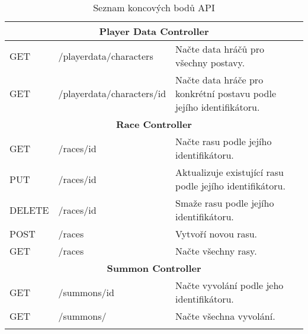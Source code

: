 \begin{longtable}{|l|l|p{}|}
    \hline
    \multicolumn{3}{|c|}{\textbf{Player Data Controller}}                                                                                                                                      \\
    \hline
    GET             & /playerdata/characters      & Načte data hráčů pro všechny postavy.                                                                                                      \\
    GET             & /playerdata/characters/{id} & Načte data hráče pro konkrétní postavu podle jejího identifikátoru.                                                                        \\
    \hline
    \multicolumn{3}{|c|}{\textbf{Race Controller}}                                                                                                                                             \\
    \hline
    GET             & /races/{id}                 & Načte rasu podle jejího identifikátoru.                                                                                                    \\
    PUT             & /races/{id}                 & Aktualizuje existující rasu podle jejího identifikátoru.                                                                                   \\
    DELETE          & /races/{id}                 & Smaže rasu podle jejího identifikátoru.                                                                                                    \\
    POST            & /races                      & Vytvoří novou rasu.                                                                                                                        \\
    GET             & /races                      & Načte všechny rasy.                                                                                                                        \\
    \hline
    \multicolumn{3}{|c|}{\textbf{Summon Controller}}                                                                                                                                           \\
    \hline
    GET             & /summons/{id}               & Načte vyvolání podle jeho identifikátoru.                                                                                                  \\
    GET             & /summons/                   & Načte všechna vyvolání.                                                                                                                    \\
    \hline
    \caption{Seznam koncových bodů API}
    \label{tab:endpoints}
\end{longtable}